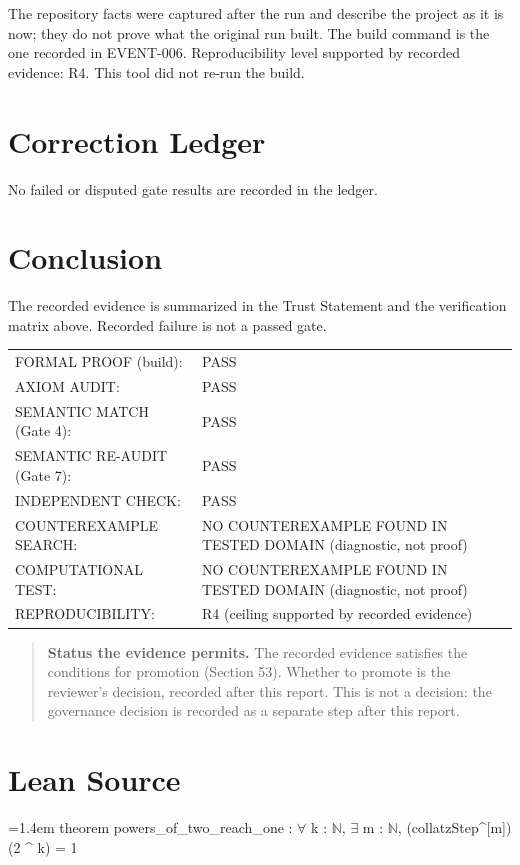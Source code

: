 \documentclass[11pt]{article}
\begin{document}
The repository facts were captured after the run and describe the project as it is now; they do not prove what the original run built. The build command is the one recorded in EVENT-006.
Reproducibility level supported by recorded evidence: R4. This tool did not re-run the build.
\section{Correction Ledger}
No failed or disputed gate results are recorded in the ledger.


\section{Conclusion}
The recorded evidence is summarized in the Trust Statement and the verification matrix above. Recorded failure is not a passed gate.
\begin{center}\begin{tabular}{@{}p{}p{}@{}}
FORMAL PROOF (build): & PASS \\
AXIOM AUDIT: & PASS \\
SEMANTIC MATCH (Gate 4): & PASS \\
SEMANTIC RE-AUDIT (Gate 7): & PASS \\
INDEPENDENT CHECK: & PASS \\
COUNTEREXAMPLE SEARCH: & NO COUNTEREXAMPLE FOUND IN TESTED DOMAIN (diagnostic, not proof) \\
COMPUTATIONAL TEST: & NO COUNTEREXAMPLE FOUND IN TESTED DOMAIN (diagnostic, not proof) \\
REPRODUCIBILITY: & R4 (ceiling supported by recorded evidence) \\
\end{tabular}\end{center}
\begin{quote}\textbf{Status the evidence permits.} The recorded evidence satisfies the conditions for promotion (Section 53). Whether to promote is the reviewer's decision, recorded after this report. This is not a decision: the governance decision is recorded as a separate step after this report.\end{quote}
\appendix
\section{Lean Source}
{\footnotesize\ttfamily\raggedright\hangindent=1.4em\noindent
\hspace*{0.00em}theorem powers\_\allowbreak{}of\_\allowbreak{}two\_\allowbreak{}reach\_\allowbreak{}one : \ensuremath{\forall} k : \ensuremath{\mathbb{N}}, \ensuremath{\exists} m : \ensuremath{\mathbb{N}}, (collatzStep\textasciicircum{}[m]) (2 \textasciicircum{} k) = 1\par
}
\end{document}
